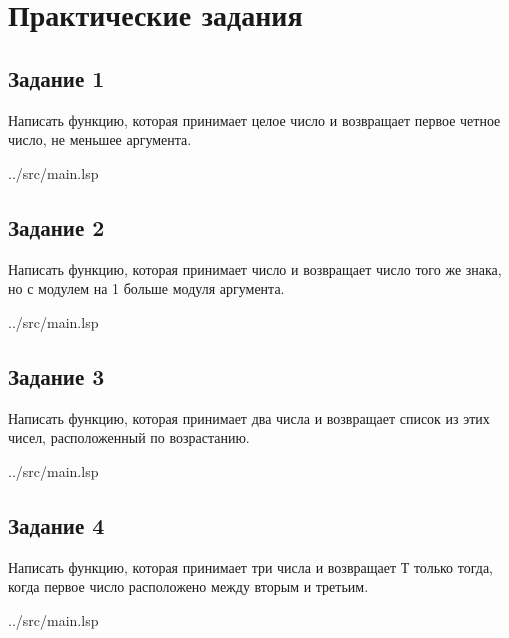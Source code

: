 \chapter{Практические задания}

\section*{Задание 1}

Написать функцию, которая принимает целое число и возвращает первое четное число, не меньшее аргумента.

\begin{lstinputlisting}[
	caption={Задание 1},
	label={lst:t1},
	linerange={3-9},
	]{../src/main.lsp}
\end{lstinputlisting}

\section*{Задание 2}

Написать функцию, которая принимает число и возвращает число того же знака, но с модулем на 1 больше модуля аргумента.

\begin{lstinputlisting}[
	caption={Задание 2},
	label={lst:t2},
	linerange={30-35},
	]{../src/main.lsp}
\end{lstinputlisting}

\section*{Задание 3}

Написать функцию, которая принимает два числа и возвращает список из этих чисел, расположенный по возрастанию.

\begin{lstinputlisting}[
	caption={Задание 3},
	label={lst:t3},
	linerange={43-48},
	]{../src/main.lsp}
\end{lstinputlisting}

\section*{Задание 4}

Написать функцию, которая принимает три числа и возвращает Т только тогда, когда первое число расположено между вторым и третьим.

\begin{lstinputlisting}[
	caption={Задание 4},
	label={lst:t4},
	linerange={56-60},
	]{../src/main.lsp}
\end{lstinputlisting}


